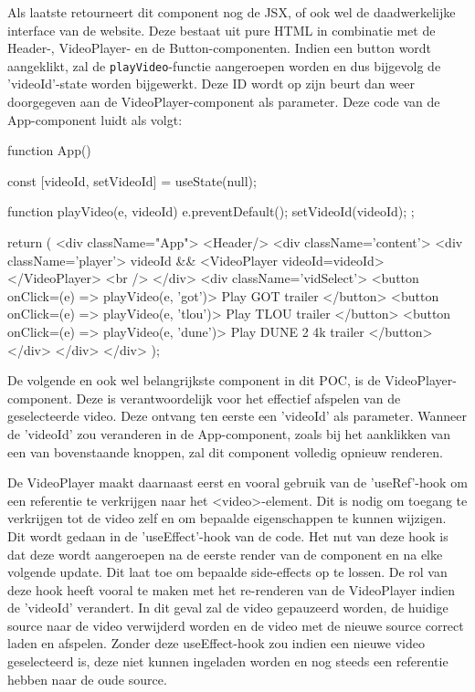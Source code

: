 Als laatste retourneert dit component nog de JSX, of ook wel de daadwerkelijke interface van de website. Deze bestaat uit pure HTML in combinatie met de Header-, VideoPlayer- en de Button-componenten. Indien een button wordt aangeklikt, zal de \verb|playVideo|-functie aangeroepen worden en dus bijgevolg de 'videoId'-state worden bijgewerkt. Deze ID wordt op zijn beurt dan weer doorgegeven aan de VideoPlayer-component als parameter. Deze code van de App-component luidt als volgt:


\begin{LVerbatim}[language=JavaScript]
function App() {
  const [videoId, setVideoId] = useState(null);

  function playVideo(e, videoId) {
    e.preventDefault();
    setVideoId(videoId);
  };

  return (
    <div className="App">
      <Header/>
      <div className='content'>
        <div className='player'>
          {videoId && <VideoPlayer videoId={videoId}></VideoPlayer>} <br />
        </div>
        <div className='vidSelect'>
          <button onClick={(e) => playVideo(e, 'got')}>
            Play GOT trailer
          </button>
          <button onClick={(e) => playVideo(e, 'tlou')}>
            Play TLOU trailer
          </button>
          <button onClick={(e) => playVideo(e, 'dune')}>
            Play DUNE 2 4k trailer
          </button>
        </div>
      </div>
    </div>
  );
}
\end{LVerbatim}

De volgende en ook wel belangrijkste component in dit POC, is de VideoPlayer-component. Deze is verantwoordelijk voor het effectief afspelen van de geselecteerde video. Deze ontvang ten eerste een 'videoId' als parameter. Wanneer de 'videoId' zou veranderen in de App-component, zoals bij het aanklikken van een van bovenstaande knoppen, zal dit component volledig opnieuw renderen.

De VideoPlayer maakt daarnaast eerst en vooral gebruik van de 'useRef'-hook om een referentie te verkrijgen naar het <video>-element. Dit is nodig om toegang te verkrijgen tot de video zelf en om bepaalde eigenschappen te kunnen wijzigen. Dit wordt gedaan in de 'useEffect'-hook van de code. Het nut van deze hook is dat deze wordt aangeroepen na de eerste render van de component en na elke volgende update. Dit laat toe om bepaalde side-effects op te lossen. De rol van deze hook heeft vooral te maken met het re-renderen van de VideoPlayer indien de 'videoId' verandert. In dit geval zal de video gepauzeerd worden, de huidige source naar de video verwijderd worden en de video met de nieuwe source correct laden en afspelen. Zonder deze useEffect-hook zou indien een nieuwe video geselecteerd is, deze niet kunnen ingeladen worden en nog steeds een referentie hebben naar de oude source.


